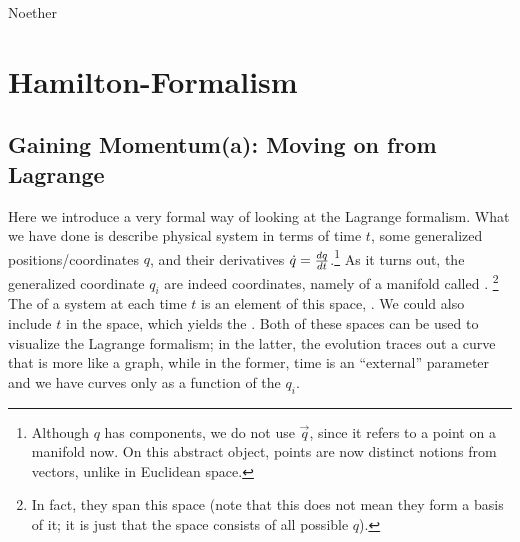 \documentclass[../class_mech_main.tex]{subfiles}
\begin{document}
Noether



	\section{Hamilton-Formalism}


		\subsection{Gaining Momentum(a): Moving on from Lagrange}

Here we introduce a very formal way of looking at the Lagrange formalism. What we have done is describe physical system in terms of time $t$, some generalized positions/coordinates $q$, and their derivatives $\dot{q} = \dv{q}{t}$.\footnote{Although $q$ has components, we do not use $\vec{q}$, since it refers to a point on a manifold now. On this abstract object, points are now distinct notions from vectors, unlike in Euclidean space.}
As it turns out, the generalized coordinate $q_i$ are indeed coordinates, namely of a manifold called .%
\footnote{In fact, they span this space (note that this does not mean they form a basis of it; it is just that the space consists of all possible $q$). }
The  of a system at each time $t$ is an element of this space, . We could also include $t$ in the space, which yields the . Both of these spaces can be used to visualize the Lagrange formalism; in the latter, the evolution traces out a curve that is more like a graph, while in the former, time is an \enquote{external} parameter and we have curves only as a function of the $q_i$.
\end{document}
